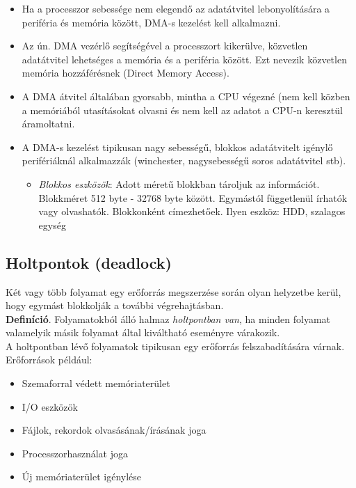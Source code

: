 \documentclass[tikz,12pt,margin=0px]{article}
\begin{document}
    \begin{itemize}[topsep=8pt,itemsep=4pt,partopsep=4pt, parsep=4pt]
        \item Ha a processzor sebessége nem elegendő az adatátvitel lebonyolítására a periféria és memória között, DMA-s kezelést kell alkalmazni.
        \item Az ún. DMA vezérlő segítségével a processzort kikerülve, közvetlen adatátvitel lehetséges a memória és a periféria között. Ezt nevezik közvetlen memória hozzáférésnek (Direct Memory Access).
        \item A DMA átvitel általában gyorsabb, mintha a CPU végezné (nem kell közben a memóriából utasításokat olvasni és nem kell az adatot a CPU-n keresztül áramoltatni.
        \item A DMA-s kezelést tipikusan nagy sebességű, blokkos adatátvitelt igénylő perifériáknál alkalmazzák (winchester, nagysebességű soros adatátvitel stb).
        	\begin{itemize}
                \item \textit{Blokkos eszközök}: Adott méretű blokkban tároljuk az információt. Blokkméret 512 byte - 32768 byte között. Egymástól függetlenül írhatók vagy olvashatók. Blokkonként címezhetőek. Ilyen eszköz: HDD, szalagos egység
	        \end{itemize}
    \end{itemize}

	\subsection*{Holtpontok (deadlock)}
	
    Két vagy több folyamat egy erőforrás megszerzése során olyan helyzetbe kerül, hogy egymást blokkolják a további végrehajtásban.\\

    \noindent \textbf{Definíció}. Folyamatokból álló halmaz \emph{holtpontban van}, ha minden folyamat valamelyik másik folyamat által kiváltható eseményre várakozik.\\

    \noindent A holtpontban lévő folyamatok tipikusan egy erőforrás felszabadítására várnak.\\

    \noindent Erőforrások például:

    \begin{itemize}[topsep=8pt,itemsep=4pt,partopsep=4pt, parsep=4pt]
        \item Szemaforral védett memóriaterület
        \item I/O eszközök
        \item Fájlok, rekordok olvasásának/írásának joga
        \item Processzorhasználat joga
        \item Új memóriaterület igénylése
    \end{itemize}
\end{document}
